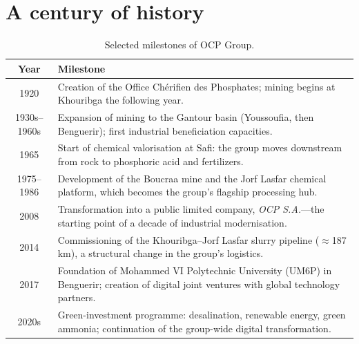 \documentclass[11pt,a4paper]{report}
\begin{document}
\section{A century of history}
\begin{table}[H]
\centering
\caption{Selected milestones of OCP Group.}
\label{tab:ocp-history}
\small
\renewcommand{\arraystretch}{1.25}
\begin{tabular}{@{}c p{11.5cm}@{}}
\toprule
\textbf{Year} & \textbf{Milestone} \\
\midrule
1920 & Creation of the Office Ch\'erifien des Phosphates; mining begins at
Khouribga the following year. \\
1930s--1960s & Expansion of mining to the Gantour basin (Youssoufia, then
Benguerir); first industrial beneficiation capacities. \\
1965 & Start of chemical valorisation at Safi: the group moves downstream
from rock to phosphoric acid and fertilizers. \\
1975--1986 & Development of the Boucraa mine and the Jorf Lasfar chemical
platform, which becomes the group's flagship processing hub. \\
2008 & Transformation into a public limited company, \emph{OCP S.A.}---the
starting point of a decade of industrial modernisation. \\
2014 & Commissioning of the Khouribga--Jorf Lasfar slurry pipeline
($\approx$187\,km), a structural change in the group's logistics. \\
2017 & Foundation of Mohammed VI Polytechnic University (UM6P) in Benguerir;
creation of digital joint ventures with global technology partners. \\
2020s & Green-investment programme: desalination, renewable energy, green
ammonia; continuation of the group-wide digital transformation. \\
\bottomrule
\end{tabular}
\end{table}
\end{document}
